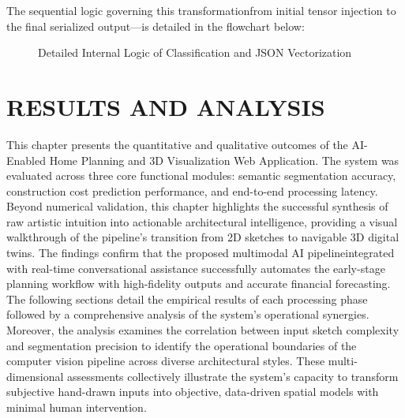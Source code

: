\documentclass[12pt]{report}
\begin{document}
The sequential logic governing this transformation\—from initial tensor injection to the final serialized output—is detailed in the flowchart below:
\newpage



\begin{figure}[H]
\centering
{}
\caption{Detailed Internal Logic of Classification and JSON Vectorization\cite{ronneberger2015, douglas1973}}
\label{fig:segmentation}
\end{figure} 

\chapter{RESULTS AND ANALYSIS}

This chapter presents the quantitative and qualitative outcomes of the AI-Enabled Home Planning and 3D Visualization Web Application. The system was evaluated across three core functional modules: semantic segmentation accuracy, construction cost prediction performance, and end-to-end processing latency. Beyond numerical validation, this chapter highlights the successful synthesis of raw artistic intuition into actionable architectural intelligence, providing a visual walkthrough of the pipeline's transition from 2D sketches to navigable 3D digital twins. The findings confirm that the proposed multimodal AI pipeline\-integrated with real-time conversational assistance successfully automates the early-stage planning workflow with high-fidelity outputs and accurate financial forecasting. The following sections detail the empirical results of each processing phase followed by a comprehensive analysis of the system's operational synergies. Moreover, the analysis examines the correlation between input sketch complexity and segmentation precision to identify the operational boundaries of the computer vision pipeline across diverse architectural styles. These multi-dimensional assessments collectively illustrate the system's capacity to transform subjective hand-drawn inputs into objective, data-driven spatial models with minimal human intervention.
\end{document}
